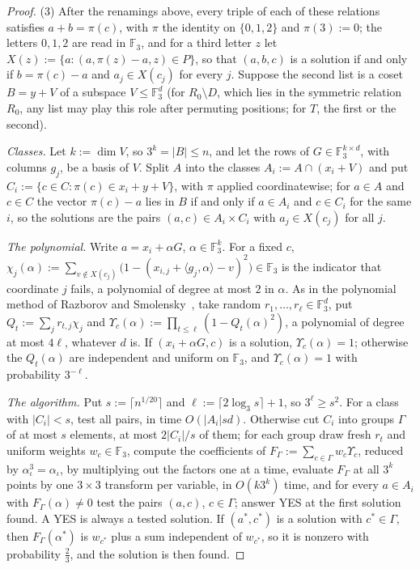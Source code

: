 \documentclass[11pt]{article}
\theoremstyle{definition}
\theoremstyle{remark}
\begin{document}
\begin{proof}
(3) After the renamings above, every triple of each of these relations satisfies $a+b=\pi(c)$, with $\pi$ the identity on $\{0,1,2\}$ and $\pi(3):=0$; the letters $0,1,2$ are read in $\mathbb F_3$, and for a third letter $z$ let $X(z):=\{a:(a,\pi(z)-a,z)\in P\}$, so that $(a,b,c)$ is a solution if and only if $b=\pi(c)-a$ and $a_j\in X(c_j)$ for every $j$. Suppose the second list is a coset $B=y+V$ of a subspace $V\le\mathbb F_3^d$ (for $R_0\setminus D$, which lies in the symmetric relation $R_0$, any list may play this role after permuting positions; for $T$, the first or the second).

\emph{Classes.} Let $k:=\dim V$, so $3^k=|B|\le n$, and let the rows of $G\in\mathbb F_3^{k\times d}$, with columns $g_j$, be a basis of $V$. Split $A$ into the classes $A_i:=A\cap(x_i+V)$ and put $C_i:=\{c\in C:\pi(c)\in x_i+y+V\}$, with $\pi$ applied coordinatewise; for $a\in A$ and $c\in C$ the vector $\pi(c)-a$ lies in $B$ if and only if $a\in A_i$ and $c\in C_i$ for the same $i$, so the solutions are the pairs $(a,c)\in A_i\times C_i$ with $a_j\in X(c_j)$ for all $j$.

\emph{The polynomial.} Write $a=x_i+\alpha G$, $\alpha\in\mathbb F_3^k$. For a fixed $c$, $\chi_j(\alpha):=\sum_{v\notin X(c_j)}\bigl(1-(x_{i,j}+\langle g_j,\alpha\rangle-v)^2\bigr)\in\mathbb F_3$ is the indicator that coordinate $j$ fails, a polynomial of degree at most $2$ in $\alpha$. As in the polynomial method of Razborov and Smolensky~\cite{Raz87,Smo87}, take random $r_1,\dots,r_\ell\in\mathbb F_3^d$, put $Q_t:=\sum_jr_{t,j}\chi_j$ and $\Upsilon_c(\alpha):=\prod_{t\le\ell}(1-Q_t(\alpha)^2)$, a polynomial of degree at most $4\ell$, whatever $d$ is. If $(x_i+\alpha G,c)$ is a solution, $\Upsilon_c(\alpha)=1$; otherwise the $Q_t(\alpha)$ are independent and uniform on $\mathbb F_3$, and $\Upsilon_c(\alpha)=1$ with probability $3^{-\ell}$.

\emph{The algorithm.} Put $s:=\lceil n^{1/20}\rceil$ and $\ell:=\lceil2\log_3s\rceil+1$, so $3^\ell\ge s^2$. For a class with $|C_i|<s$, test all pairs, in time $O(|A_i|sd)$. Otherwise cut $C_i$ into groups $\Gamma$ of at most $s$ elements, at most $2|C_i|/s$ of them; for each group draw fresh $r_t$ and uniform weights $w_c\in\mathbb F_3$, compute the coefficients of $F_\Gamma:=\sum_{c\in\Gamma}w_c\Upsilon_c$, reduced by $\alpha_\iota^3=\alpha_\iota$, by multiplying out the factors one at a time, evaluate $F_\Gamma$ at all $3^k$ points by one $3\times3$ transform per variable, in $O(k3^k)$ time, and for every $a\in A_i$ with $F_\Gamma(\alpha)\ne0$ test the pairs $(a,c)$, $c\in\Gamma$; answer YES at the first solution found. A YES is always a tested solution. If $(a^\ast,c^\ast)$ is a solution with $c^\ast\in\Gamma$, then $F_\Gamma(\alpha^\ast)$ is $w_{c^\ast}$ plus a sum independent of $w_{c^\ast}$, so it is nonzero with probability $\frac23$, and the solution is then found.


\end{proof}
\end{document}
